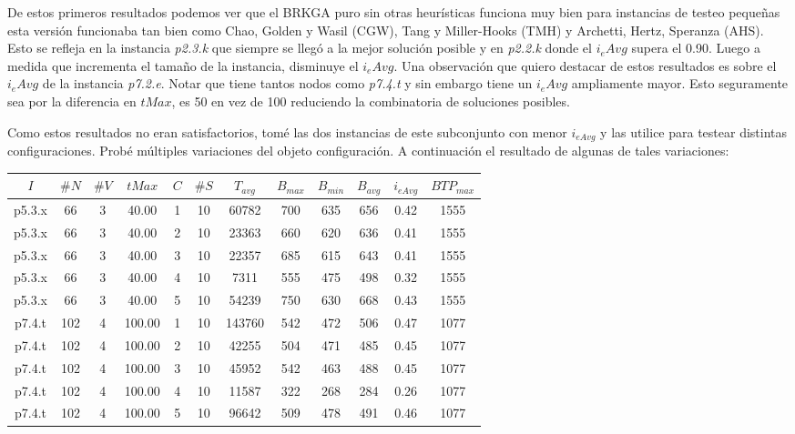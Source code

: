 \bigskip

De estos primeros resultados podemos ver que el BRKGA puro sin otras heurísticas funciona muy bien para instancias de testeo pequeñas esta versión funcionaba tan bien como Chao, Golden y Wasil \cite{ChaoGoldenWasil} (CGW), Tang y Miller-Hooks \cite{TangMillerHooks} (TMH) y Archetti, Hertz, Speranza \cite{ArchettiHertzSperanza} (AHS). Esto se refleja en la instancia \textit{p2.3.k} que siempre se llegó a la mejor solución posible y en \textit{p2.2.k} donde el $i_eAvg$ supera el 0.90. Luego a medida que incrementa el tamaño de la instancia, disminuye el $i_eAvg$. Una observación que quiero destacar de estos resultados es sobre el $i_eAvg$ de la instancia \textit{p7.2.e}. Notar que tiene tantos nodos como \textit{p7.4.t} y sin embargo tiene un $i_eAvg$ ampliamente mayor. Esto seguramente sea por la diferencia en $tMax$, es 50 en vez de 100 reduciendo la combinatoria de soluciones posibles.


\bigskip

Como estos resultados no eran satisfactorios, tomé las dos instancias de este subconjunto con menor $i_{eAvg}$ y las utilice para testear distintas configuraciones. Probé múltiples variaciones del objeto configuración. A continuación el resultado de algunas de tales variaciones:

\bigskip


\begin{center}
\begin{tabular}{ |c|c|c|c|c|c|c|c|c|c|c|c| } 
 \hline
$I$ & $\#N$ & $\#V$ & $tMax$ & $C$ & $\#S$ & $T_{avg}$ & $B_{max}$ & $B_{min}$ & $B_{avg}$ & $i_{eAvg}$ & $BTP_{max}$ \\
\hline
p5.3.x & 66 & 3 & 40.00 & 1 & 10 & 60782 & 700 & 635 & 656 & 0.42 & 1555  \\
p5.3.x & 66 & 3 & 40.00 & 2 & 10 & 23363 & 660 & 620 & 636 & 0.41 & 1555  \\
p5.3.x & 66 & 3 & 40.00 & 3 & 10 & 22357 & 685 & 615 & 643 & 0.41 & 1555  \\
p5.3.x & 66 & 3 & 40.00 & 4 & 10 & 7311 & 555 & 475 & 498 & 0.32 & 1555  \\
p5.3.x & 66 & 3 & 40.00 & 5 & 10 & 54239 & 750 & 630 & 668 & 0.43 & 1555  \\
p7.4.t & 102 & 4 & 100.00 & 1 & 10 & 143760 & 542 & 472 & 506 & 0.47 & 1077  \\
p7.4.t & 102 & 4 & 100.00 & 2 & 10 & 42255 & 504 & 471 & 485 & 0.45 & 1077  \\
p7.4.t & 102 & 4 & 100.00 & 3 & 10 & 45952 & 542 & 463 & 488 & 0.45 & 1077  \\
p7.4.t & 102 & 4 & 100.00 & 4 & 10 & 11587 & 322 & 268 & 284 & 0.26 & 1077  \\
p7.4.t & 102 & 4 & 100.00 & 5 & 10 & 96642 & 509 & 478 & 491 & 0.46 & 1077  \\
\hline
\end{tabular}
\end{center}

